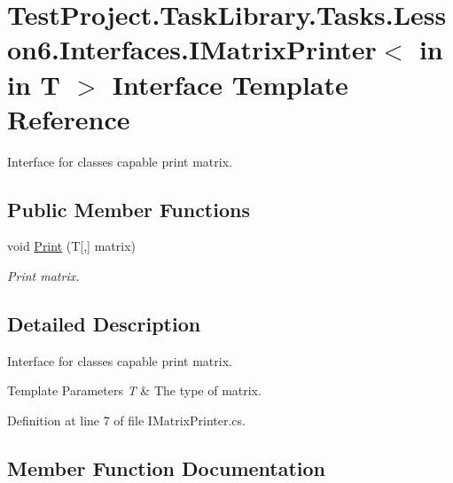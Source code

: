 \hypertarget{interface_test_project_1_1_task_library_1_1_tasks_1_1_lesson6_1_1_interfaces_1_1_i_matrix_printer}{}\section{Test\+Project.\+Task\+Library.\+Tasks.\+Lesson6.\+Interfaces.\+I\+Matrix\+Printer$<$ in in T $>$ Interface Template Reference}
\label{interface_test_project_1_1_task_library_1_1_tasks_1_1_lesson6_1_1_interfaces_1_1_i_matrix_printer}


Interface for classes capable print matrix.  


\subsection*{Public Member Functions}
\begin{DoxyCompactItemize}
\item 
void \mbox{\hyperlink{interface_test_project_1_1_task_library_1_1_tasks_1_1_lesson6_1_1_interfaces_1_1_i_matrix_printer_a3376f2e398c7bcbc3017631d7438e417}{Print}} (T\mbox{[},\mbox{]} matrix)
\begin{DoxyCompactList}\small\item\em Print matrix. \end{DoxyCompactList}\end{DoxyCompactItemize}


\subsection{Detailed Description}
Interface for classes capable print matrix. 


\begin{DoxyTemplParams}{Template Parameters}
{\em T} & The type of matrix.\\
\hline
\end{DoxyTemplParams}


Definition at line 7 of file I\+Matrix\+Printer.\+cs.



\subsection{Member Function Documentation}
\mbox{\label{interface_test_project_1_1_task_library_1_1_tasks_1_1_lesson6_1_1_interfaces_1_1_i_matrix_printer_a3376f2e398c7bcbc3017631d7438e417}} 

